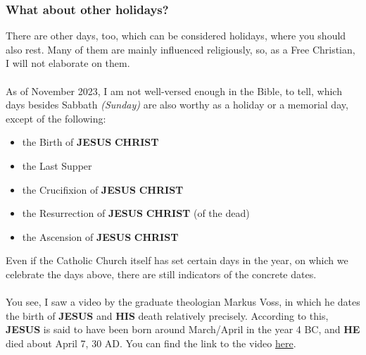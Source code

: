 \documentclass[12pt,a5paper]{article}
\newcommand{\Christ}[0]{\textbf{CHRIST}}
\newcommand{\He}[0]{\textbf{HE}}
\newcommand{\His}[0]{\textbf{HIS}}
\newcommand{\Jesus}[0]{\textbf{JESUS}}
\begin{document}
	\subsubsection{What about other holidays?}
		There are other days,
		too,
		which can be considered holidays,
		where you should also rest.
		Many of them are mainly influenced religiously,
		so,
		as a Free Christian,
		I will not elaborate on them.
		\\
		\\
		As of November 2023,
		I am not well-versed enough in the Bible,
		to tell,
		which days besides Sabbath \textit{(Sunday)} are also worthy as a holiday
		or a memorial day,
		except of the following:
		\begin{itemize}[noitemsep]
			\item the Birth of {\Jesus} {\Christ}
			\item the Last Supper
			\item the Crucifixion of {\Jesus} {\Christ}
			\item the Resurrection of {\Jesus} {\Christ} (of the dead)
			\item the Ascension of {\Jesus} {\Christ}
		\end{itemize}
		Even if the Catholic Church itself has set certain days in the year,
		on which we celebrate the days above,
		there are still indicators of the concrete dates.
		\\
		\\
		You see,
		I saw a video by the graduate theologian Markus Voss,
		in which he dates the birth of {\Jesus} and {\His} death relatively precisely.
		According to this,
		{\Jesus} is said to have been born around March/April in the year 4 BC,
		and {\He} died about April 7, 30 AD.
		You can find the link to the video \href{https://www.youtube.com/watch?v=Bv3Rfd1oZ9I}{here}.
\end{document}
